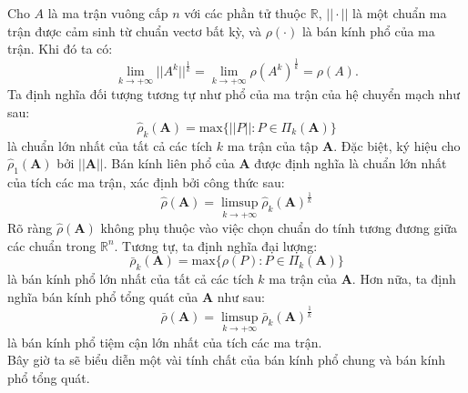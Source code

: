 \documentclass[14pt,a4paper,oneside]{report}		%
\theoremstyle{definition}
\begin{document}
Cho $A$ là ma trận vuông cấp $n$ với các phần tử thuộc $\mathbb{R}$, $||\cdot||$ là một chuẩn ma trận được cảm sinh từ chuẩn vectơ bất kỳ, và $\rho(\cdot)$ là bán kính phổ của ma trận. Khi đó ta có: 
$$\lim_{k\rightarrow +\infty}||A^k||^\frac{1}{k}=\lim_{k\rightarrow +\infty}\rho(A^k)^\frac{1}{k}=\rho(A).$$
Ta định nghĩa đối tượng tương tự như phổ của ma trận của hệ chuyển mạch như sau:
\begin{equation} \label{eq2-34}
\widehat{\rho}_k(\mathbf{A})=\text{max}\{||P||:P\in\Pi_k(\mathbf{A})\}
\end{equation}
là chuẩn lớn nhất của tất cả các tích $k$ ma trận của tập $\mathbf{A}$. Đặc biệt, ký hiệu cho $\widehat{\rho}_1(\mathbf{A})$ bởi $||\mathbf{A}||$. Bán kính liên phổ của $\mathbf{A}$ được định nghĩa là chuẩn lớn nhất của tích các ma trận, xác định bởi công thức sau:
\begin{equation} \label{eq2-35}
\widehat{\rho}(\mathbf{A})=\limsup_{k\rightarrow +\infty}\widehat{\rho}_k(\mathbf{A})^\frac{1}{k}
\end{equation}
Rõ ràng $\widehat{\rho}(\mathbf{A})$ không phụ thuộc vào việc chọn chuẩn do tính tương đương giữa các chuẩn trong $\mathbb{R}^n$. Tương tự, ta định nghĩa đại lượng:
$$\bar{\rho}_k(\mathbf{A})=\text{max}\{\rho(P):P\in\Pi_k(\mathbf{A})\}$$
là bán kính phổ lớn nhất của tất cả các tích $k$ ma trận của $\mathbf{A}$. Hơn nữa, ta định nghĩa bán kính phổ tổng quát của $\mathbf{A}$ như sau:
\begin{equation} \label{eq2-36}
\bar{\rho}(\mathbf{A})=\limsup_{k\rightarrow +\infty}\bar{\rho}_k(\mathbf{A})^\frac{1}{k}
\end{equation}
là bán kính phổ tiệm cận lớn nhất của tích các ma trận.\\

Bây giờ ta sẽ biểu diễn một vài tính chất của bán kính phổ chung và bán kính phổ tổng quát.\\
\end{document}
